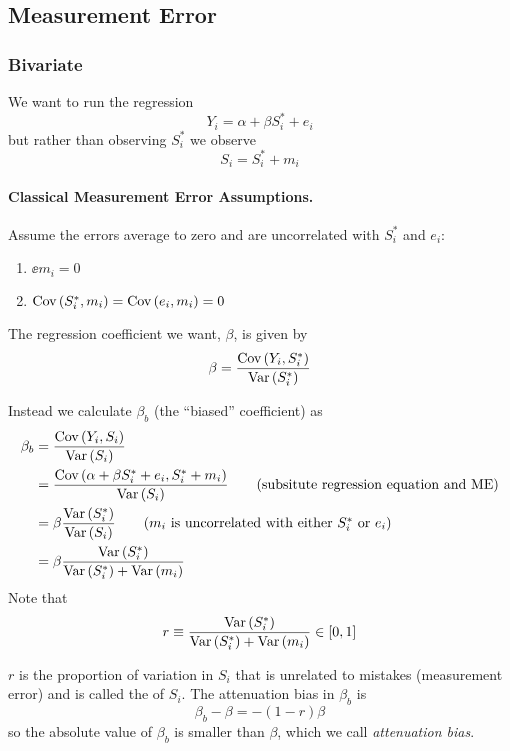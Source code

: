 \documentclass[11pt]{article}
\begin{document}
\subsection{Measurement Error}

\subsubsection{Bivariate}

We want to run the regression
\begin{equation}
	Y_i = \alpha + \beta S_i^* + e_i
\end{equation}
but rather than observing $S_i^*$ we observe
\begin{equation}
	S_i = S_i^* + m_i
\end{equation}

\paragraph*{Classical Measurement Error Assumptions.} Assume the errors average to zero and are uncorrelated with $S_i^*$ and $e_i$:
\begin{enumerate}
	\item $\ee{m_i} = 0$ 
	\item $\text{Cov}\left( S^*_i,m_i \right) = \text{Cov}\left( e_i,m_i \right) = 0$
\end{enumerate}

The regression coefficient we want, $\beta$, is given by
\begin{equation}
	\beta = \frac{\text{Cov}\left( Y_i, S_i^* \right)}{\text{Var}\left( S_i^* \right)}
\end{equation}

Instead we calculate $\beta_b$ (the ``biased'' coefficient) as
\begin{align*}
	\beta_b &= \frac{\text{Cov}\left( Y_i, S_i \right)}{\text{Var}\left( S_i \right)} \\
	&= \frac{\text{Cov}\left( \alpha + \beta S_i^* + e_i, S_i^* + m_i \right)}{\text{Var}\left( S_i \right)} \tag{subsitute regression equation and ME} \\
	&= \beta \frac{\text{Var}\left( S_i^* \right)}{\text{Var}\left( S_i \right)}  \tag{$m_i$ is uncorrelated with either $S^*_i$ or $e_i$} \\
	&= \beta \frac{\text{Var}\left( S_i^* \right)}{\text{Var}\left( S^*_i \right) + \text{Var}\left( m_i \right)}
\end{align*}
Note that
\begin{equation}
	r \equiv \frac{\text{Var}\left( S_i^* \right)}{\text{Var}\left( S^*_i \right) + \text{Var}\left( m_i \right)} \in [0,1]
\end{equation}

\begin{interpretation}
	$r$ is the proportion of variation in $S_i$ that is unrelated to mistakes (measurement error) and is called the  of $S_i$. The attenuation bias in $\beta_b$ is
	\begin{equation}
		\beta_b - \beta = -(1-r)\beta
	\end{equation}
	so the absolute value of $\beta_b$ is smaller than $\beta$, which we call \emph{attenuation bias}.
\end{interpretation}
\end{document}
